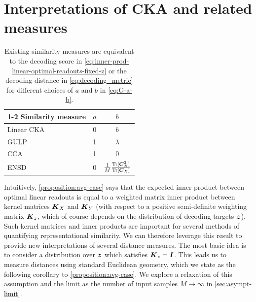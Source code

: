 \section{Interpretations of CKA and related measures}
\label{sec:cka-interpretation-section}

\begin{table}
  \centering
  \begin{tabular}{lcc}
    \toprule
    \cmidrule(r){1-2}
    Similarity measure     & $a$     & $b$ \\
    \midrule
    Linear CKA & 0  & $b$     \\
    GULP & 1 & $\lambda$ \\
    CCA     & 1 & 0      \\
    ENSD     & 0       & $\frac1M\frac{\operatorname*{Tr}[\boldsymbol{C}_X^2]}{\operatorname*{Tr}[\boldsymbol{C}_X]}$  \\
    \bottomrule
  \end{tabular}
  \vspace{1em}
  \caption{Existing similarity measures are equivalent to the decoding score in \cref{eq:inner-prod-linear-optimal-readouts-fixed-z} or the decoding distance in \cref{eq:decoding_metric} for different choices of $a$ and $b$ in \cref{eq:G-a-b}.}
  \label{tab:GX}
\end{table}

Intuitively, \cref{proposition:avg-case} says that the expected inner product between optimal linear readouts is equal to a weighted matrix inner product between kernel matrices $\boldsymbol{K}_X$ and $\boldsymbol{K}_Y$ (with respect to a positive semi-definite weighting matrix $\boldsymbol{K}_z$, which of course depends on the distribution of decoding targets $\boldsymbol{z}$).
Such kernel matrices and inner products are important for several methods of quantifying representational similarity.
We can therefore leverage this result to provide new interpretations of several distance measures.
The most basic idea is to consider a distribution over $\boldsymbol{z}$ which satisfies $\boldsymbol{K}_z = \boldsymbol{I}$.
This leads us to measure distances using standard Euclidean geometry, which we state as the following corollary to \cref{proposition:avg-case}.  
We explore a relaxation of this assumption and the limit as the number of input samples $M\rightarrow \infty$ in \cref{sec:asympt-limit}.

